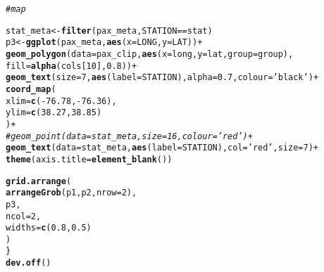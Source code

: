 \documentclass[letterpaper,12pt]{article}\usepackage[]{graphicx}\usepackage[]{color}
\makeatletter
\newcommand{\hlnum}[1]{\textcolor[rgb]{0.686,0.059,0.569}{#1}}%
\newcommand{\hlstr}[1]{\textcolor[rgb]{0.192,0.494,0.8}{#1}}%
\newcommand{\hlcom}[1]{\textcolor[rgb]{0.678,0.584,0.686}{\textit{#1}}}%
\newcommand{\hlopt}[1]{\textcolor[rgb]{0,0,0}{#1}}%
\newcommand{\hlstd}[1]{\textcolor[rgb]{0.345,0.345,0.345}{#1}}%
\newcommand{\hlkwb}[1]{\textcolor[rgb]{0.69,0.353,0.396}{#1}}%
\newcommand{\hlkwc}[1]{\textcolor[rgb]{0.333,0.667,0.333}{#1}}%
\newcommand{\hlkwd}[1]{\textcolor[rgb]{0.737,0.353,0.396}{\textbf{#1}}}%
\newenvironment{kframe}{%
 \def\at@end@of@kframe{}%
 \ifinner\ifhmode%
  \def\at@end@of@kframe{\end{minipage}}%
  \begin{minipage}{\columnwidth}%
 \fi\fi%
 \def\FrameCommand##1{\hskip\@totalleftmargin \hskip-\fboxsep
 \colorbox{shadecolor}{##1}\hskip-\fboxsep
     \hskip-\linewidth \hskip-\@totalleftmargin \hskip\columnwidth}%
 \MakeFramed {\advance\hsize-\width
   \@totalleftmargin\z@ \linewidth\hsize
   \@setminipage}}%
 {\par\unskip\endMakeFramed%
 \at@end@of@kframe}
\makeatother
\begin{document}
\begin{kframe}
\begin{alltt}
  \hlcom{# map}

  \hlstd{stat_meta} \hlkwb{<-} \hlkwd{filter}\hlstd{(pax_meta, STATION} \hlopt{==} \hlstd{stat)}
  \hlstd{p3} \hlkwb{<-} \hlkwd{ggplot}\hlstd{(pax_meta,} \hlkwd{aes}\hlstd{(}\hlkwc{x} \hlstd{= LONG,} \hlkwc{y} \hlstd{= LAT))} \hlopt{+}
    \hlkwd{geom_polygon}\hlstd{(}\hlkwc{data} \hlstd{= pax_clip,} \hlkwd{aes}\hlstd{(}\hlkwc{x} \hlstd{= long,} \hlkwc{y} \hlstd{= lat,} \hlkwc{group} \hlstd{= group),}
      \hlkwc{fill} \hlstd{=} \hlkwd{alpha}\hlstd{(cols[}\hlnum{10}\hlstd{],} \hlnum{0.8}\hlstd{))} \hlopt{+}
    \hlkwd{geom_text}\hlstd{(}\hlkwc{size} \hlstd{=} \hlnum{7}\hlstd{,} \hlkwd{aes}\hlstd{(}\hlkwc{label} \hlstd{= STATION),} \hlkwc{alpha} \hlstd{=} \hlnum{0.7}\hlstd{,} \hlkwc{colour} \hlstd{=} \hlstr{'black'}\hlstd{)} \hlopt{+}
    \hlkwd{coord_map}\hlstd{(}
      \hlkwc{xlim} \hlstd{=} \hlkwd{c}\hlstd{(}\hlopt{-}\hlnum{76.78}\hlstd{,} \hlopt{-}\hlnum{76.36}\hlstd{),}
      \hlkwc{ylim} \hlstd{=} \hlkwd{c}\hlstd{(}\hlnum{38.27}\hlstd{,} \hlnum{38.85}\hlstd{)}
    \hlstd{)} \hlopt{+}
    \hlcom{# geom_point(data = stat_meta, size = 16, colour = 'red') +}
    \hlkwd{geom_text}\hlstd{(}\hlkwc{data} \hlstd{= stat_meta,} \hlkwd{aes}\hlstd{(}\hlkwc{label} \hlstd{= STATION),} \hlkwc{col} \hlstd{=} \hlstr{'red'}\hlstd{,} \hlkwc{size} \hlstd{=} \hlnum{7}\hlstd{)} \hlopt{+}
    \hlkwd{theme}\hlstd{(}\hlkwc{axis.title} \hlstd{=} \hlkwd{element_blank}\hlstd{())}

  \hlkwd{grid.arrange}\hlstd{(}
    \hlkwd{arrangeGrob}\hlstd{(p1, p2,} \hlkwc{nrow} \hlstd{=} \hlnum{2}\hlstd{),}
    \hlstd{p3,}
    \hlkwc{ncol} \hlstd{=} \hlnum{2}\hlstd{,}
    \hlkwc{widths} \hlstd{=} \hlkwd{c}\hlstd{(}\hlnum{0.8}\hlstd{,} \hlnum{0.5}\hlstd{)}
    \hlstd{)}
\hlstd{\}}
\hlkwd{dev.off}\hlstd{()}
\end{alltt}
\end{kframe}
\end{document}
